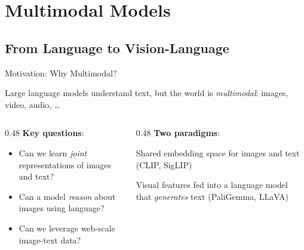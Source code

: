 
\section{Multimodal Models}

\subsection{From Language to Vision-Language}

\begin{frame}{Motivation: Why Multimodal?}

  Large language models understand text, but the world is \emph{multimodal}: images, video, audio, \ldots

  \vspace{0.4em}
  \begin{columns}
    \begin{column}{0.48\textwidth}
      \textbf{Key questions}:
      \begin{itemize}
        \item Can we learn \emph{joint} representations of images and text?
        \item Can a model \emph{reason} about images using language?
        \item Can we leverage web-scale image-text data?
      \end{itemize}
    \end{column}
    \begin{column}{0.48\textwidth}
      \textbf{Two paradigms}:
      \begin{description}[style=nextline]
        \item[Contrastive alignment] Shared embedding space for images and text (CLIP, SigLIP)
        \item[Generative VLM] Visual features fed into a language model that \emph{generates} text (PaliGemma, LLaVA)
      \end{description}
    \end{column}
  \end{columns}


\end{frame}
